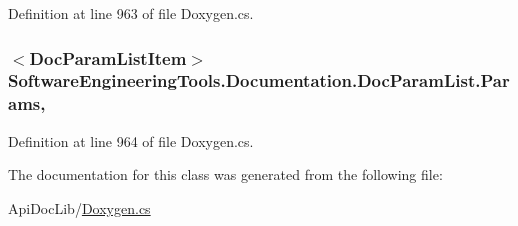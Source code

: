 Definition at line 963 of file Doxygen.\+cs.

\hypertarget{class_software_engineering_tools_1_1_documentation_1_1_doc_param_list_a2c0a39217a99edd79f005ee66acd3137}{
\subsubsection[{Params}]{$<${\bf Doc\+Param\+List\+Item}$>$ Software\+Engineering\+Tools.\+Documentation.\+Doc\+Param\+List.\+Params\hspace{0.3cm}{\ttfamily [get]}, {\ttfamily [set]}}}\label{class_software_engineering_tools_1_1_documentation_1_1_doc_param_list_a2c0a39217a99edd79f005ee66acd3137}


Definition at line 964 of file Doxygen.\+cs.



The documentation for this class was generated from the following file\+:\begin{DoxyCompactItemize}
\item 
Api\+Doc\+Lib/\hyperlink{_doxygen_8cs}{Doxygen.\+cs}\end{DoxyCompactItemize}
